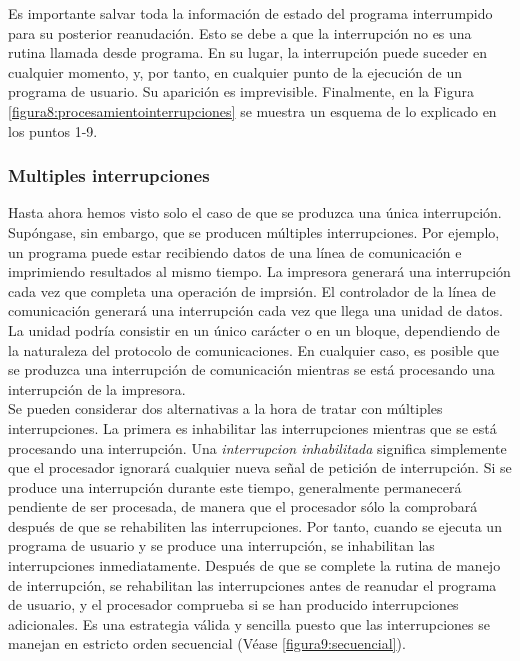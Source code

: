 \documentclass{article}
\begin{document}
						Es importante salvar toda la información de estado del programa interrumpido para su posterior reanudación. Esto se debe a que la interrupción no es una rutina llamada desde programa. En su lugar, la interrupción puede suceder en cualquier momento, y, por tanto, en cualquier punto de la ejecución de un programa de usuario. Su aparición es imprevisible. Finalmente, en la Figura \ref{figura8:procesamientointerrupciones} se muestra un esquema de lo explicado en los puntos 1-9.
						
						\subsubsection{Multiples interrupciones}
							Hasta ahora hemos visto solo el caso de que se produzca una única interrupción. Supóngase, sin embargo, que se producen múltiples interrupciones. Por ejemplo, un programa puede estar recibiendo datos de una línea de comunicación e imprimiendo resultados al mismo tiempo. La impresora generará una interrupción cada vez que completa una operación de imprsión. El controlador de la línea de comunicación generará una interrupción cada vez que llega una unidad de datos. La unidad podría consistir en un único carácter o en un bloque, dependiendo de la naturaleza del protocolo de comunicaciones. En cualquier caso, es posible que se produzca una interrupción de comunicación mientras se está procesando una interrupción de la impresora. \\ 
							
							Se pueden considerar dos alternativas a la hora de tratar con múltiples interrupciones. La primera es inhabilitar las interrupciones mientras que se está procesando una interrupción. Una \textit{interrupcion inhabilitada} significa simplemente que el procesador ignorará cualquier nueva señal de petición de interrupción. Si se produce una interrupción durante este tiempo, generalmente permanecerá pendiente de ser procesada, de manera que el procesador sólo la comprobará después de que se rehabiliten las interrupciones. Por tanto, cuando se ejecuta un programa de usuario y se produce una interrupción, se inhabilitan las interrupciones inmediatamente. Después de que se complete la rutina de manejo de interrupción, se rehabilitan las interrupciones antes de reanudar el programa de usuario, y el procesador comprueba si se han producido interrupciones adicionales. Es una estrategia válida y sencilla puesto que las interrupciones se manejan en estricto orden secuencial (Véase \ref{figura9:secuencial}). \\
							
\end{document}
